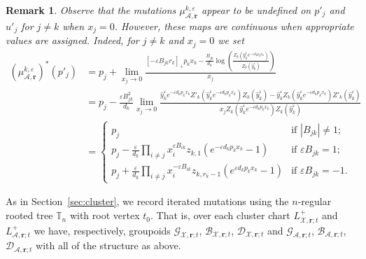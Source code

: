 \documentclass{amsart}
\newtheorem{remark}[theorem]{Remark}
\numberwithin{equation}{section}
\newcommand{\bfr}{{\boldsymbol{r}}}
\newcommand{\cA}{\mathcal{A}}
\newcommand{\cB}{\mathcal{B}}
\newcommand{\cD}{\mathcal{D}}
\newcommand{\cG}{\mathcal{G}}
\newcommand{\cX}{\mathcal{X}}
\newcommand{\TT}{\mathbb{T}}
\begin{document}
\begin{remark}
  Observe that the mutations $\mu_{\cA,\bfr}^{k,\varepsilon}$ appear to be undefined on $p'_j$ and $u'_j$ for $j\ne k$ when $x_j=0$.
  However, these maps are continuous when appropriate values are assigned.
  Indeed, for $j\ne k$ and $x_j=0$ we set
  \begin{align*}
    (\mu_{\cA,\bfr}^{k,\varepsilon})^*(p'_j)
    &=p_j+\lim_{x_j \to 0}\frac{[-\varepsilon B_{jk} r_k]_+ p_k x_k - \frac{B_{jk}}{d_k}\log\left(\frac{Z_k(\hat y_k^\varepsilon e^{-\varepsilon d_kp_kx_k})}{Z_k(\hat y_k^\varepsilon)}\right)}{x_j}\\
    &=p_j-\frac{\varepsilon B_{jk}^2}{d_k} \lim_{x_j\to 0} \frac{ \hat y_k^\varepsilon e^{-\varepsilon d_kp_kx_k} Z'_k(\hat y_k^\varepsilon e^{-\varepsilon d_kp_kx_k}) Z_k(\hat y_k^\varepsilon) - \hat y_k^\varepsilon Z_k(\hat y_k^\varepsilon e^{-\varepsilon d_kp_kx_k}) Z'_k(\hat y_k^\varepsilon) }{ x_j Z_k(\hat y_k^\varepsilon e^{-\varepsilon d_kp_kx_k}) Z_k(\hat y_k^\varepsilon) }\\
    &=\begin{cases} 
      p_j & \text{if $|B_{jk}| \ne 1$;}\\ 
      p_j - \frac{\varepsilon}{d_k} \prod_{i\ne j} x_i^{\varepsilon B_{ik}} z_{k,1} (e^{-\varepsilon d_kp_kx_k} - 1) & \text{if $\varepsilon B_{jk} = 1$;}\\ 
      p_j + \frac{\varepsilon}{d_k} \prod_{i\ne j} x_i^{-\varepsilon B_{ik}} z_{k,r_k-1} (e^{\varepsilon d_kp_kx_k} - 1) & \text{if $\varepsilon B_{jk} = -1$.}
    \end{cases}
  \end{align*}
\end{remark}

As in Section~\ref{sec:cluster}, we record iterated mutations using the $n$-regular rooted tree $\TT_n$ with root vertex $t_0$.
That is, over each cluster chart $L^+_{\cX,\bfr;t}$ and $L^+_{\cA,\bfr;t}$ we have, respectively, groupoids $\cG_{\cX,\bfr;t}$, $\cB_{\cX,\bfr;t}$, $\cD_{\cX,\bfr;t}$ and $\cG_{\cA,\bfr;t}$, $\cB_{\cA,\bfr;t}$, $\cD_{\cA,\bfr;t}$ with all of the structure as above.
\end{document}
